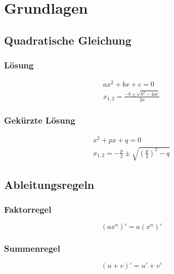 
\section{Grundlagen} 
\label{sec:grundlagen}

\subsection{Quadratische Gleichung} %
\label{sub:quadratische_gleichung}

\subsubsection{Lösung} %
\label{ssub:loesung}
\begin{eqnarray}
  ax^2+bx+c=0\\
  x_{1,2}=\frac{-b\pm\sqrt{b^2-4ac}}{2a}
\end{eqnarray}	


\subsubsection{Gekürzte Lösung} %
\label{ssub:gekuerzte_loesung}
\begin{eqnarray}
  x^2+px+q=0\\
  x_{1,2}=-\frac{p}{2}\pm\sqrt{\left(\frac{p}{2}\right)^2-q}
\end{eqnarray}

\subsection{Ableitungsregeln} 
\label{sub:ableitungsregeln}

\subsubsection{Faktorregel}
\label{ssub:faktorregel}
\begin{equation}
	(ax^n)' = a(x^n)' 
\end{equation}	

\subsubsection{Summenregel}
\label{ssub:summenregel}
\begin{equation}
	(u+v)' = u' + v' 
\end{equation}	


